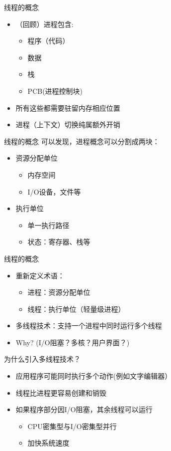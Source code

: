 \documentclass[xcolor=svgnames]{beamer}
\begin{document}
\begin{CJK*}{UTF8}{gbsn}
\begin{frame}{线程的概念}
\begin{itemize}
\item （回顾）进程包含:
\begin{itemize}
\item 程序（代码）
\item 数据
\item 栈
\item PCB(进程控制块)
\end{itemize}
\item 所有这些都需要驻留内存相应位置
\item 进程（上下文）切换纯属额外开销
\end{itemize}
\end{frame}

\begin{frame}{线程的概念}
可以发现，进程概念可以分割成两块：
\begin{itemize}
\item 资源分配单位
\begin{itemize}
\item 内存空间
\item I/O设备，文件等
\end{itemize}
\item 执行单位
\begin{itemize}
\item 单一执行路径
\item 状态：寄存器、栈等
\end{itemize}
\end{itemize}
\end{frame}

\begin{frame}{线程的概念}
\begin{itemize}
\item 重新定义术语：
\begin{itemize}
\item 进程：资源分配单位
\item 线程：执行单位（轻量级进程）
\end{itemize}
\item 多线程技术：支持一个进程中同时运行多个线程
\item Why? (I/O阻塞？多核？用户界面？)
\end{itemize}
\end{frame}

\begin{frame}{为什么引入多线程技术？}
\begin{itemize}
\item 应用程序可能同时执行多个动作(例如文字编辑器）
\item 线程比进程更容易创建和销毁
\item 如果程序部分因I/O阻塞，其余线程可以运行
\begin{itemize}
\item CPU密集型与I/O密集型并行
\item 加快系统速度
\end{itemize}
\end{itemize}
\end{frame}


\end{CJK*}
\end{document}

